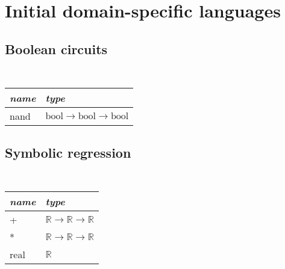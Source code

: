 \documentclass{article}
\begin{document}
\section{Initial domain-specific languages}
\subsection{Boolean circuits}
\begin{center}
\tt
\begin{tabular}{| l | l |}
  \hline
  \textrm{\emph{name}} & \textrm{\emph{type}} \\
  \hline
    nand & $\text{bool}\to \text{bool}\to \text{bool}$ \\  \hline
\end{tabular}
\end{center}

\subsection{Symbolic regression}
\begin{center}
\tt
\begin{tabular}{| l | l |}
  \hline
  \textrm{\emph{name}} & \textrm{\emph{type}} \\
  \hline
  + & $\mathbb{R}\to \mathbb{R}\to \mathbb{R}$ \\
  *&  $\mathbb{R}\to \mathbb{R}\to \mathbb{R}$\\
  real&$\mathbb{R}$\\\hline
\end{tabular}
\end{center}
\end{document}

